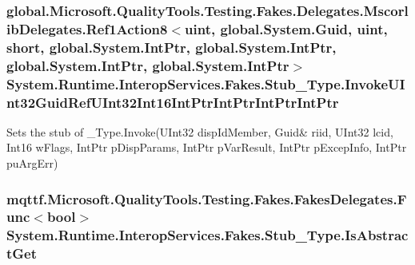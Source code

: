 \hypertarget{class_system_1_1_runtime_1_1_interop_services_1_1_fakes_1_1_stub___type_a680a7cc74d9df492f540685225d68f5d}{
\subsubsection[{Invoke\-U\-Int32\-Guid\-Ref\-U\-Int32\-Int16\-Int\-Ptr\-Int\-Ptr\-Int\-Ptr\-Int\-Ptr}]{\setlength{\rightskip}{0pt plus 5cm}global.\-Microsoft.\-Quality\-Tools.\-Testing.\-Fakes.\-Delegates.\-Mscorlib\-Delegates.\-Ref1\-Action8$<$uint, global.\-System.\-Guid, uint, short, global.\-System.\-Int\-Ptr, global.\-System.\-Int\-Ptr, global.\-System.\-Int\-Ptr, global.\-System.\-Int\-Ptr$>$ System.\-Runtime.\-Interop\-Services.\-Fakes.\-Stub\-\_\-\-Type.\-Invoke\-U\-Int32\-Guid\-Ref\-U\-Int32\-Int16\-Int\-Ptr\-Int\-Ptr\-Int\-Ptr\-Int\-Ptr}}\label{class_system_1_1_runtime_1_1_interop_services_1_1_fakes_1_1_stub___type_a680a7cc74d9df492f540685225d68f5d}


Sets the stub of \-\_\-\-Type.\-Invoke(U\-Int32 disp\-Id\-Member, Guid\& riid, U\-Int32 lcid, Int16 w\-Flags, Int\-Ptr p\-Disp\-Params, Int\-Ptr p\-Var\-Result, Int\-Ptr p\-Excep\-Info, Int\-Ptr pu\-Arg\-Err)

\hypertarget{class_system_1_1_runtime_1_1_interop_services_1_1_fakes_1_1_stub___type_a0e098f07885e6ae16f6bf03d7d8b1079}{
\subsubsection[{Is\-Abstract\-Get}]{\setlength{\rightskip}{0pt plus 5cm}mqttf.\-Microsoft.\-Quality\-Tools.\-Testing.\-Fakes.\-Fakes\-Delegates.\-Func$<$bool$>$ System.\-Runtime.\-Interop\-Services.\-Fakes.\-Stub\-\_\-\-Type.\-Is\-Abstract\-Get}}\label{class_system_1_1_runtime_1_1_interop_services_1_1_fakes_1_1_stub___type_a0e098f07885e6ae16f6bf03d7d8b1079}


